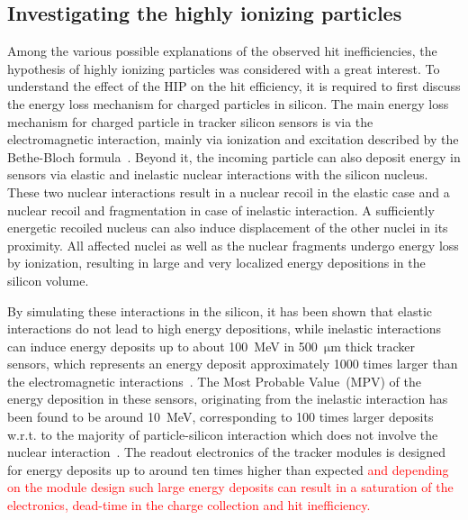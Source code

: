 





\subsection{Investigating the highly ionizing particles}

Among the various possible explanations of the observed hit inefficiencies, the hypothesis of highly ionizing particles was considered with a great interest. To understand the effect of the HIP on the hit efficiency, it is required to first discuss the energy loss mechanism for charged particles in silicon. The main energy loss mechanism for charged particle in tracker silicon sensors is via the electromagnetic interaction, mainly via ionization and excitation described by the Bethe-Bloch formula~\cite{Groom:2000sm}. Beyond it, the incoming particle can also deposit energy in sensors via elastic and inelastic nuclear interactions with the silicon nucleus. These two nuclear interactions result in a nuclear recoil in the elastic case and a nuclear recoil and fragmentation in case of inelastic interaction. A sufficiently energetic recoiled nucleus can also induce displacement of the other nuclei in its proximity. All affected nuclei as well as the nuclear fragments undergo energy loss by ionization, resulting in large and very localized energy depositions in the silicon volume. 

By simulating these interactions in the silicon, it has been shown that elastic interactions do not lead to high energy depositions, while inelastic interactions can induce energy deposits up to about 100~MeV in 500~$\mathrm{\mu m}$ thick tracker sensors, which represents an energy deposit approximately 1000 times larger than the electromagnetic interactions~\cite{Huhtinen:2002yda}. The Most Probable Value~(MPV) of the energy deposition in these sensors, originating from the inelastic interaction has been found to be around 10~MeV, corresponding to 100 times larger deposits w.r.t. to the majority of particle-silicon interaction which does not involve the nuclear interaction~\cite{Adam:2005pz}. The readout electronics of the tracker modules is designed for energy deposits up to around ten times higher than expected \textcolor{red}{ and depending on the module design such large energy deposits can result in a saturation of the electronics, dead-time in the charge collection and hit inefficiency.} 

